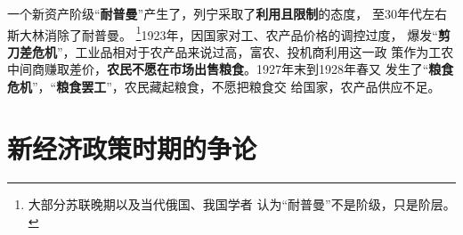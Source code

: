 \begin{enumerate}
  一个新资产阶级“\textbf{耐普曼}”产生了，列宁采取了\textbf{利用且限制}的态度，
  至30年代左右斯大林消除了耐普曼。 \footnote{大部分苏联晚期以及当代俄国、我国学者
    认为“耐普曼”不是阶级，只是阶层。}1923年，因国家对工、农产品价格的调控过度，
  爆发“\textbf{剪刀差危机}”，工业品相对于农产品来说过高，富农、投机商利用这一政
  策作为工农中间商赚取差价，\textbf{农民不愿在市场出售粮食}。1927年末到1928年春又
  发生了“\textbf{粮食危机}”，“\textbf{粮食罢工}”，农民藏起粮食，不愿把粮食交
  给国家，农产品供应不足。

\end{enumerate}

\section{新经济政策时期的争论}

